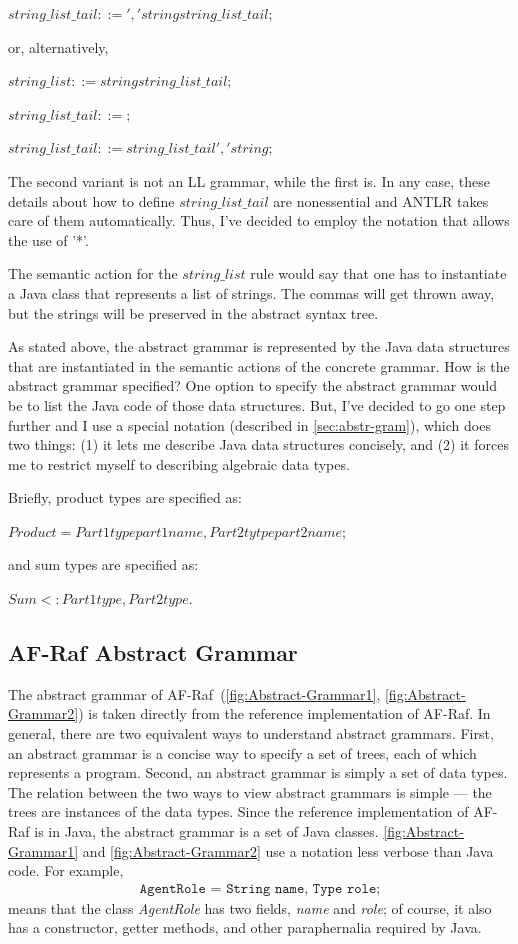 \documentclass[a4paper,12pt,oneside,fleqn]{book} %
\begin{document}
$string\_list\_tail ::= ',' string string\_list\_tail;$

or, alternatively,

$string\_list ::= string string\_list\_tail;$

$string\_list\_tail ::= ;$

$string\_list\_tail ::= string\_list\_tail ',' string;$

The second variant is not an LL grammar, while the first is. In any case,
these details about how to define $string\_list\_tail$ are nonessential and
ANTLR takes care of them automatically. Thus, I've decided to employ the
notation that allows the use of '*'.

The semantic action for the $string\_list$ rule would say that one has to
instantiate a Java class that represents a list of strings. The commas will
get thrown away, but the strings will be preserved in the abstract syntax
tree.

As stated above, the abstract grammar is represented by the Java data
structures that are instantiated in the semantic actions of the concrete
grammar. How is the abstract grammar specified? One option to specify the
abstract grammar would be to list the Java code of those data structures.
But, I've decided to go one step further and I use a special notation
(described in \autoref{sec:abstr-gram}), which does two things: (1) it lets
me describe Java data structures concisely, and (2) it forces me to
restrict myself to describing algebraic data types.

Briefly, product types are specified as:

  $Product = Part1type part1name, Part2tytpe part2name;$

  and sum types are specified as:

    $Sum <: Part1type, Part2type.$


    \subsection{AF-Raf Abstract Grammar}\label{sec:abstr-gram} %
The abstract grammar of AF-Raf~(\autoref{fig:Abstract-Grammar1},
\autoref{fig:Abstract-Grammar2}) is taken
directly from the reference implementation of AF-Raf.  In general, there
are two equivalent ways to understand abstract grammars. First, an abstract
grammar is a concise way to specify a set of trees, each of which
represents a program. Second, an abstract grammar is simply a set of data
types. The relation between the two ways to view abstract grammars is
simple --- the trees are instances of the data types. Since the reference
implementation of AF-Raf is in Java, the abstract grammar is a set of Java
classes. \autoref{fig:Abstract-Grammar1} and \autoref{fig:Abstract-Grammar2} use a notation less verbose than Java code. For example,
\begin{align}
\texttt{AgentRole = String name, Type role;}
\end{align}
means that the class {\it AgentRole\/} has two fields, {\it name\/} and
{\it role}; of course, it also has a constructor, getter methods, and other
paraphernalia required by Java.
\end{document}
